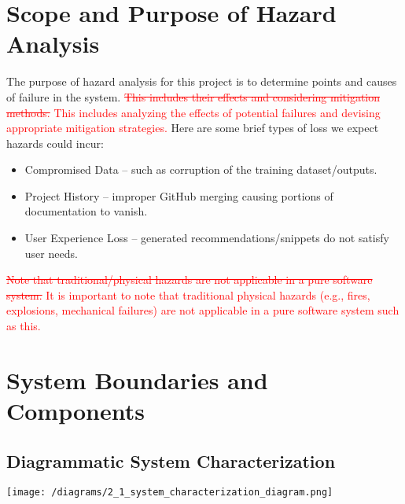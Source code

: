 \documentclass{article}
\begin{document}
\section{Scope and Purpose of Hazard Analysis}
The purpose of hazard analysis for this project is to determine points and causes of failure in the system. \textcolor{red}{\sout{This includes their effects and considering mitigation methods.}} \textcolor{red}{This includes analyzing the effects of potential failures and devising appropriate mitigation strategies.} Here are some brief types of loss we expect hazards could incur: \\
\begin{itemize}
    \item Compromised Data -- such as corruption of the training dataset/outputs.
    \item Project History -- improper GitHub merging causing portions of documentation to vanish.
    \item User Experience Loss -- generated recommendations/snippets do not satisfy user needs.
\end{itemize}

\textcolor{red}{\sout{Note that traditional/physical hazards are not applicable in a pure software system.}} \textcolor{red}{It is important to note that traditional physical hazards (e.g., fires, explosions, mechanical failures) are not applicable in a pure software system such as this.}

\section{System Boundaries and Components}
\subsection{Diagrammatic System Characterization}
\begin{center}
    \texttt{[image: /diagrams/2\_1\_system\_characterization\_diagram.png]}
\end{center}
\end{document}
